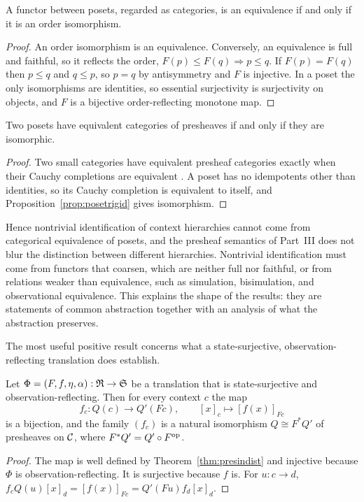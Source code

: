 \begin{proposition}\label{prop:posetrigid}
A functor between posets, regarded as categories, is an equivalence if and only if it is an order isomorphism.
\end{proposition}
\begin{proof}
An order isomorphism is an equivalence. Conversely, an equivalence is full and faithful, so it reflects the order, $F(p)\le F(q)\Rightarrow p\le q$. If $F(p)=F(q)$ then $p\le q$ and $q\le p$, so $p=q$ by antisymmetry and $F$ is injective. In a poset the only isomorphisms are identities, so essential surjectivity is surjectivity on objects, and $F$ is a bijective order-reflecting monotone map.
\end{proof}

\begin{corollary}\label{cor:morita}
Two posets have equivalent categories of presheaves if and only if they are isomorphic.
\end{corollary}
\begin{proof}
Two small categories have equivalent presheaf categories exactly when their Cauchy completions are equivalent \cite{borceux}. A poset has no idempotents other than identities, so its Cauchy completion is equivalent to itself, and Proposition~\ref{prop:posetrigid} gives isomorphism.
\end{proof}

Hence nontrivial identification of context hierarchies cannot come from categorical equivalence of posets, and the presheaf semantics of Part~III does not blur the distinction between different hierarchies. Nontrivial identification must come from functors that coarsen, which are neither full nor faithful, or from relations weaker than equivalence, such as simulation, bisimulation, and observational equivalence. This explains the shape of the results: they are statements of common abstraction together with an analysis of what the abstraction preserves.

The most useful positive result concerns what a state-surjective, observation-reflecting translation does establish.

\begin{theorem}\label{thm:relequiv}
Let $\Phi=(F,f,\eta,\alpha):\mathfrak R\to\mathfrak S$ be a translation that is state-surjective and observation-reflecting. Then for every context $c$ the map
\[
f_c:Q(c)\to Q'(Fc),\qquad[x]_c\mapsto[f(x)]_{Fc}
\]
is a bijection, and the family $(f_c)$ is a natural isomorphism $Q\cong F^{\ast}Q'$ of presheaves on $\mathcal C$, where $F^{\ast}Q'=Q'\circ F^{\mathrm{op}}$.
\end{theorem}
\begin{proof}
The map is well defined by Theorem~\ref{thm:presindist} and injective because $\Phi$ is observation-reflecting. It is surjective because $f$ is. For $u:c\to d$, $f_cQ(u)[x]_d=[f(x)]_{Fc}=Q'(Fu)f_d[x]_d$.
\end{proof}

